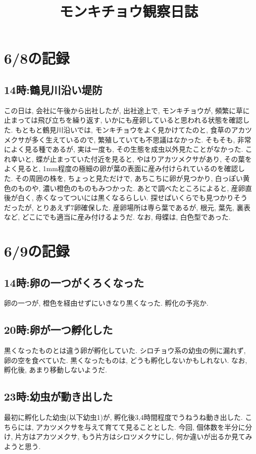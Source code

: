 \documentclass{jsarticle}
\title{モンキチョウ観察日誌}
\begin{document}
\maketitle

\section{6/8の記録}
\subsection{14時:鶴見川沿い堤防}
この日は, 会社に午後から出社したが, 出社途上で, モンキチョウが, 頻繁に草に止まっては飛び立ちを繰り返す, いかにも産卵していると思われる状態を確認した. 
もともと鶴見川沿いでは, モンキチョウをよく見かけてたのと, 食草のアカツメクサが多く生えているので, 繁殖していても不思議はなかった. 
そもそも, 非常によく見る種であるが, 実は一度も, その生態を成虫以外見たことがなかった. 
これ幸いと, 蝶が止まっていた付近を見ると, やはりアカツメクサがあり, その葉をよく見ると, 1mm程度の極細の卵が葉の表面に産み付けられているのを確認した. 
その周囲の株を, ちょっと見ただけで, あちこちに卵が見つかり, 白っぽい黄色のものや, 濃い橙色のものもみつかった. 
あとで調べたところによると, 産卵直後が白く, 赤くなってついには黒くなるらしい. 
探せばいくらでも見つかりそうだったが, とりあえず7卵確保した. 
産卵場所は専ら葉であるが, 根元, 葉先, 裏表など, どこにでも適当に産み付けるようだ. 
なお, 母蝶は, 白色型であった. 

\section{6/9の記録}
\subsection{14時:卵の一つがくろくなった}
卵の一つが, 橙色を経由せずにいきなり黒くなった. 孵化の予兆か. 

\subsection{20時:卵が一つ孵化した}
黒くなったものとは違う卵が孵化していた. シロチョウ系の幼虫の例に漏れず, 卵の空を食べていた. 
黒くなったものは, どうも孵化しないかもしれない. 
なお, 孵化後, あまり移動しないようだ. 

\subsection{23時:幼虫が動き出した}
最初に孵化した幼虫(以下幼虫1)が, 孵化後3,4時間程度でうねうね動き出した. こちらには, アカツメクサを与えて育てて見ることとした. 今回, 個体数を半分に分け, 片方はアカツメクサ, もう片方はシロツメクサにし, 何か違いが出るか見てみようと思う. 
\end{document}
